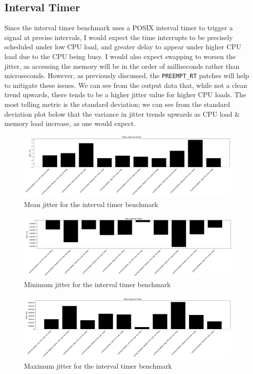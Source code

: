 \documentclass[a4paper]{article}
\begin{document}
\subsection{Interval Timer}
Since the interval timer benchmark uses a POSIX interval timer to trigger a signal at precise intervals, I would expect the time interrupts to be precisely scheduled under low CPU load, and greater delay to appear under higher CPU load due to the CPU being busy. 
I would also expect swapping to worsen the jitter, as accessing the memory will be in the order of milliseconds rather than microseconds.
However, as previously discussed, the \verb|PREEMPT_RT| patches will help to mitigate these issues.
We can see from the output data that, while not a clean trend upwards, there tends to be a higher jitter value for higher CPU loads.
The most telling metric is the standard deviation;
we can see from the standard deviation plot below that the variance in jitter trends upwards as CPU load \& memory load increase, as one would expect.

\begin{figure}[H]
    \centering
    \includegraphics[width=\textwidth]{./images/interval-mean.png}
    \caption{Mean jitter for the interval timer benchmark}
\end{figure}

\begin{figure}[H]
    \centering
    \includegraphics[width=\textwidth]{./images/interval-min.png}
    \caption{Minimum jitter for the interval timer benchmark}
\end{figure}

\begin{figure}[H]
    \centering
    \includegraphics[width=\textwidth]{./images/interval-max.png}
    \caption{Maximum jitter for the interval timer benchmark}
\end{figure}
\end{document}
